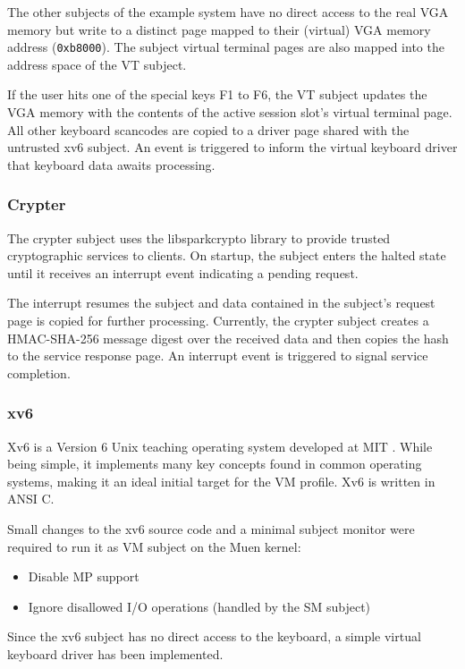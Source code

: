 The other subjects of the example system have no direct access to the real VGA
memory but write to a distinct page mapped to their (virtual) VGA memory
address (\texttt{0xb8000}). The subject virtual terminal pages are also mapped
into the address space of the VT subject.

If the user hits one of the special keys F1 to F6, the VT subject updates the
VGA memory with the contents of the active session slot's virtual terminal page.
All other keyboard scancodes are copied to a driver page shared with the
untrusted xv6 subject. An event is triggered to inform the virtual keyboard
driver that keyboard data awaits processing.

\subsubsection{Crypter}
The crypter subject uses the libsparkcrypto \cite{libsparkcrypto} library to
provide trusted cryptographic services to clients. On startup, the subject
enters the halted state until it receives an interrupt event indicating a
pending request.

The interrupt resumes the subject and data contained in the subject's request
page is copied for further processing. Currently, the crypter subject creates a
HMAC-SHA-256 message digest over the received data and then copies the hash to
the service response page. An interrupt event is triggered to signal service
completion.

\subsubsection{xv6}\label{subsubsec:xv6}
Xv6 is a Version 6 Unix \cite{wiki:unix6} teaching operating system
developed at MIT \cite{xv6}. While being simple, it implements many key
concepts found in common operating systems, making it an ideal initial target
for the VM profile. Xv6 is written in ANSI C.

Small changes to the xv6 source code and a minimal subject monitor were required
to run it as VM subject on the Muen kernel:
\begin{itemize}
	\item Disable MP support
	\item Ignore disallowed I/O operations (handled by the SM subject)
\end{itemize}

Since the xv6 subject has no direct access to the keyboard, a simple virtual
keyboard driver has been implemented.

